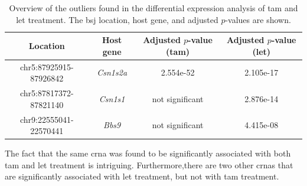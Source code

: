 \begin{table}[H] \centering \begin{tabular}{cccc} \hline Location & Host gene
                                      & Adjusted $p$-value (\gls{tam}) &
               Adjusted $p$-value (\gls{let})
               \\ \hline
               chr5:87925915-87926842 & \textit{Csn1s2a}
                                      &
               2.554e-52
                                      & 2.105e-17
               \\
               chr5:87817372-87821140 & \textit{Csn1s1}
                                      & not
               significant            & 2.876e-14
               \\
               chr9:22555041-22570441 & \textit{Bbs9}
                                      & not
               significant            & 4.415e-08
               \\
               \hline
    \end{tabular} \caption{Overview of the outliers found in the differential
        expression analysis of \gls{tam} and \gls{let} treatment.
        The \gls{bsj} location, host gene, and adjusted $p$-values are shown.
    }
    \label{tab:outliers}
\end{table}

The fact that the same \gls{crna} was found to be significantly associated with
both \gls{tam} and \gls{let} treatment is intriguing.
Furthermore,there are two other \glspl{crna} that are significantly associated
with \gls{let} treatment, but not with \gls{tam} treatment.
